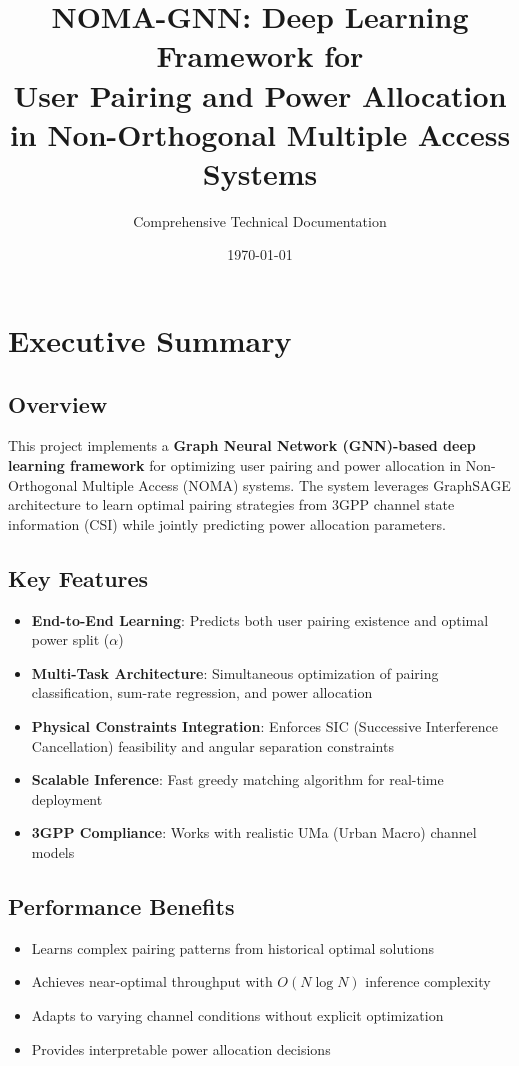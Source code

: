 \documentclass[12pt,a4paper]{article}
\title{\textbf{NOMA-GNN: Deep Learning Framework for\\User Pairing and Power Allocation\\in Non-Orthogonal Multiple Access Systems}}
\author{Comprehensive Technical Documentation}
\date{\today}
\begin{document}
\maketitle
\tableofcontents
\newpage

\section{Executive Summary}

\subsection{Overview}
This project implements a \textbf{Graph Neural Network (GNN)-based deep learning framework} for optimizing user pairing and power allocation in Non-Orthogonal Multiple Access (NOMA) systems. The system leverages GraphSAGE architecture to learn optimal pairing strategies from 3GPP channel state information (CSI) while jointly predicting power allocation parameters.

\subsection{Key Features}
\begin{itemize}
    \item \textbf{End-to-End Learning}: Predicts both user pairing existence and optimal power split ($\alpha$)
    \item \textbf{Multi-Task Architecture}: Simultaneous optimization of pairing classification, sum-rate regression, and power allocation
    \item \textbf{Physical Constraints Integration}: Enforces SIC (Successive Interference Cancellation) feasibility and angular separation constraints
    \item \textbf{Scalable Inference}: Fast greedy matching algorithm for real-time deployment
    \item \textbf{3GPP Compliance}: Works with realistic UMa (Urban Macro) channel models
\end{itemize}

\subsection{Performance Benefits}
\begin{itemize}
    \item Learns complex pairing patterns from historical optimal solutions
    \item Achieves near-optimal throughput with $O(N \log N)$ inference complexity
    \item Adapts to varying channel conditions without explicit optimization
    \item Provides interpretable power allocation decisions
\end{itemize}
\end{document}
